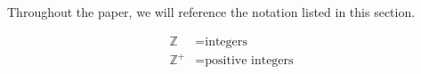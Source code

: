 Throughout the paper, we will reference the notation listed in this section.

\begin{align}
\mathbb{Z} &= \text{integers}\\
\mathbb{Z^+} &= \text{positive integers}\\
\end{align}